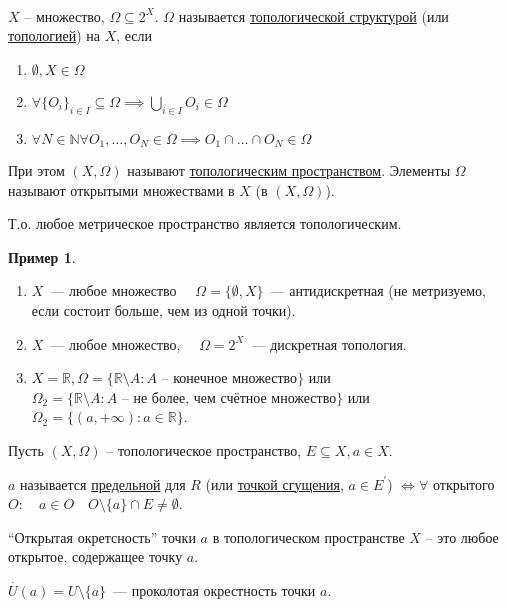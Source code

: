 \documentclass{book}
\newcommand\N{\ensuremath{\mathbb{N}}}
\newcommand\R{\ensuremath{\mathbb{R}}}
\renewcommand\O{\ensuremath{\emptyset}}
\newcommand{\p}[1]{#1^{\prime}}
\theoremstyle{definition}
\newtheorem*{example}{Пример}
\begin{document}
    \begin{definition}
        ~\\
        $X$ -- множество,  $\Omega \subseteq 2^X$. 
        $\Omega$ называется \underline{топологической структурой} (или \underline{топологией}) на $X$, если
            \begin{enumerate}
                \item $\O , X\in \Omega$
                \item $\forall \{O_i\}_{i\in I} \subseteq \Omega \implies  \bigcup\limits_{i \in  I} O_i \in \Omega$
                \item $\forall N\in \N \forall O_1, \ldots, O_N \in \Omega \implies  O_1\cap \ldots\cap O_N \in \Omega$
            \end{enumerate} 

    При этом $(X, \Omega)$ называют \underline{топологическим пространством}. Элементы  $\Omega$ называют открытыми множествами в  $X$ (в  $(X, \Omega)$).

    Т.о. любое метрическое пространство является топологическим.
    \end{definition}

    \begin{example}
       \begin{enumerate}
            \item $X$~--- любое множество $\quad \Omega = \{\O , X\}$~--- антидискретная (не метризуемо, если состоит больше, чем из одной точки).
            \item $X$~--- любое множество, $\quad \Omega = 2^X$~--- дискретная топология.
            \item $X = \R, \Omega = \{\R\setminus A: A \text{ -- конечное множество}\}$ или $\Omega_2 = \{\R\setminus A: A\text{ -- не более, чем счётное множество}\}$ или $\Omega_2 = \{(a, +\infty ):a\in \R\}$.
        \end{enumerate} 
    \end{example}

    \begin{definition}
        Пусть $(X, \Omega)$ -- топологическое пространство, $E\subseteq X, a\in X$.

        $a$ называется \underline{предельной}  для $R$ (или \underline{точкой сгущения}, $a\in \p E$) $\iff \forall $ открытого $O:\quad a\in O\quad O\setminus \{a\}\cap E\neq \O$.

        ``Открытая окретсность'' точки $a$ в топологическом пространстве $X$ -- это любое открытое, содержащее точку $a$.

        $\overset{\cdot } U(a) = U\setminus \{a\}$~--- проколотая окрестность точки $ a$.
    \end{definition}
\end{document}
